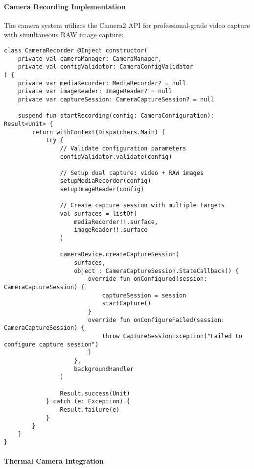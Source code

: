 \documentclass[12pt,a4paper]{report}
\begin{document}
\paragraph{Camera Recording Implementation}

The camera system utilizes the Camera2 API for professional-grade video capture with simultaneous RAW image capture:

\begin{verbatim}
class CameraRecorder @Inject constructor(
    private val cameraManager: CameraManager,
    private val configValidator: CameraConfigValidator
) {
    private var mediaRecorder: MediaRecorder? = null
    private var imageReader: ImageReader? = null
    private var captureSession: CameraCaptureSession? = null

    suspend fun startRecording(config: CameraConfiguration): Result<Unit> {
        return withContext(Dispatchers.Main) {
            try {
                // Validate configuration parameters
                configValidator.validate(config)

                // Setup dual capture: video + RAW images
                setupMediaRecorder(config)
                setupImageReader(config)

                // Create capture session with multiple targets
                val surfaces = listOf(
                    mediaRecorder!!.surface,
                    imageReader!!.surface
                )

                cameraDevice.createCaptureSession(
                    surfaces,
                    object : CameraCaptureSession.StateCallback() {
                        override fun onConfigured(session: CameraCaptureSession) {
                            captureSession = session
                            startCapture()
                        }
                        override fun onConfigureFailed(session: CameraCaptureSession) {
                            throw CaptureSessionException("Failed to configure capture session")
                        }
                    },
                    backgroundHandler
                )

                Result.success(Unit)
            } catch (e: Exception) {
                Result.failure(e)
            }
        }
    }
}
\end{verbatim}

\paragraph{Thermal Camera Integration}
\end{document}

